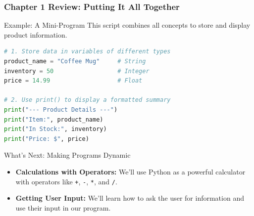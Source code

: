 \documentclass{beamer}
\begin{document}
\begin{frame}[fragile]
    \frametitle{Chapter 1 Review: Putting It All Together}
    
    \begin{block}{Example: A Mini-Program}
        This script combines all concepts to store and display product information.
\begin{lstlisting}[language=Python]
# 1. Store data in variables of different types
product_name = "Coffee Mug"     # String
inventory = 50                  # Integer
price = 14.99                   # Float

# 2. Use print() to display a formatted summary
print("--- Product Details ---")
print("Item:", product_name)
print("In Stock:", inventory)
print("Price: $", price)
\end{lstlisting}
    \end{block}
    
    \begin{alertblock}{What's Next: Making Programs Dynamic}
        \begin{itemize}
            \item \textbf{Calculations with Operators:} We'll use Python as a powerful calculator with operators like \texttt{+}, \texttt{-}, \texttt{*}, and \texttt{/}.
            \item \textbf{Getting User Input:} We'll learn how to ask the user for information and use their input in our program.
        \end{itemize}
    \end{alertblock}
    
\end{frame}
\end{document}
